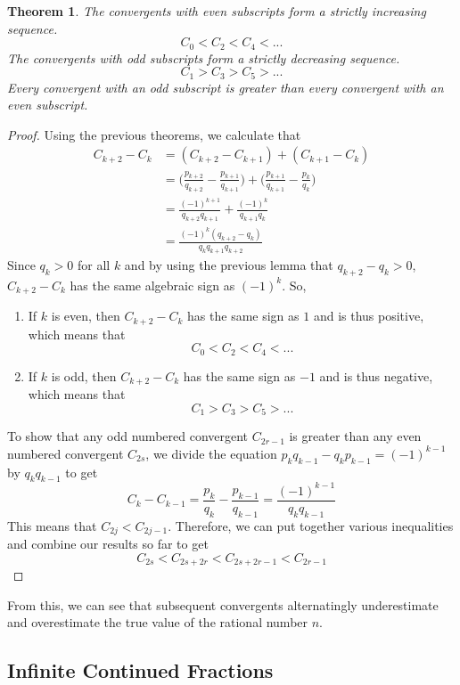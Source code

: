 \documentclass{article}
\newtheorem{theorem}{Theorem}[section]
\theoremstyle{remark}
\theoremstyle{definition}
\begin{document}
\begin{theorem}
The convergents with even subscripts form a strictly increasing sequence. 
\[C_0 < C_2 < C_4 < ... \]
The convergents with odd subscripts form a strictly decreasing sequence. 
\[C_1 > C_3 > C_5 > ...\]
Every convergent with an odd subscript is greater than every convergent with an even subscript. 
\end{theorem}
\begin{proof}
Using the previous theorems, we calculate that
\begin{align*}
    C_{k+2} - C_k & = (C_{k+2} - C_{k+1}) + (C_{k+1} - C_k )\\
    & = \bigg( \frac{p_{k+2}}{q_{k+2}} - \frac{p_{k+1}}{q_{k+1}} \bigg) + \bigg( \frac{p_{k+1}}{q_{k+1}} - \frac{p_{k}}{q_{k}} \bigg) \\
    & = \frac{(-1)^{k+1}}{q_{k+2} q_{k+1}} + \frac{(-1)^k}{q_{k+1} q_k} \\
    & = \frac{(-1)^k (q_{k+2} - q_k)}{q_k q_{k+1} q_{k+2}}
\end{align*}
Since $q_k > 0$ for all $k$ and by using the previous lemma that $q_{k+2} - q_k > 0$, $C_{k+2} - C_{k}$ has the same algebraic sign as $(-1)^k$. So, 
\begin{enumerate}
    \item If $k$ is even, then $C_{k+2} - C_{k}$ has the same sign as $1$ and is thus positive, which means that
    \[C_0 < C_2 < C_4 < ... \]
    \item If $k$ is odd, then $C_{k+2} - C_k$ has the same sign as $-1$ and is thus negative, which means that
    \[C_1 > C_3 > C_5 > ...\]
\end{enumerate}
To show that any odd numbered convergent $C_{2r-1}$ is greater than any even numbered convergent $C_{2s}$, we divide the equation $p_k q_{k-1} - q_k p_{k-1} = (-1)^{k-1}$ by $q_k q_{k-1}$ to get
\[C_k - C_{k-1} = \frac{p_k}{q_k} - \frac{p_{k-1}}{q_{k-1}} = \frac{(-1)^{k-1}}{q_k q_{k-1}}\]
This means that $C_{2j} < C_{2j-1}$. Therefore, we can put together various inequalities and combine our results so far to get
\[C_{2s} < C_{2s+2r} < C_{2s+2r-1} < C_{2r-1}\]
\end{proof}

From this, we can see that subsequent convergents alternatingly underestimate and overestimate the true value of the rational number $n$. 


\subsection{Infinite Continued Fractions}
\end{document}
